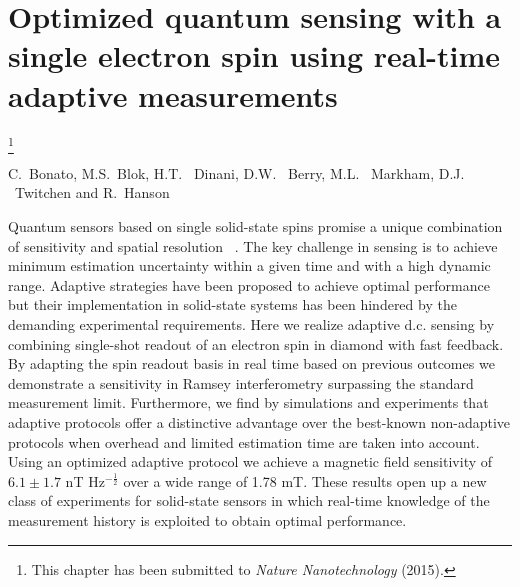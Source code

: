 

\graphicspath{{./ch_adptv_msmnt_magnetometry/figures/}}


\chapter{ Optimized quantum sensing with a single electron spin
using real-time adaptive measurements}
\label{ch:AMM}


{\renewcommand{\thefootnote}{}\footnote{This chapter has been submitted to
    {\em Nature Nanotechnology} (2015).}}

\begin{center} 
    \vspace{-1cm} {C.~Bonato, M.S.~Blok, H.T. ~Dinani, D.W. ~Berry, M.L. ~Markham, D.J. ~Twitchen  and R.~Hanson} 
\end{center}


\vspace{-0.5cm} 
Quantum sensors based on single solid-state spins promise a unique combination of sensitivity and spatial resolution ~\cite{Giovannetti_NatPhoton_2011,Higgins_Nature_2007,Degen_APL_2008,Taylor_NatPhys_2008,Maze_Nature_2008,Balasubramanian_Nature_2008,Balasubramanian_NatMater_2009,Dolde_NatPhys_2011,Acosta_Phys.Rev.Lett._2010,Toyli_PNAS_2013,Ovartchaiyapong_NatCommun_2014,LeSage_Nature_2013,Kaufmann_PNAS_2013,Kucsko_Nature_2013,Shi_Science_2015,Maletinsky_NatNano_2012,Staudacher_Science_2013,Mamin_Science_2013,Tetienne_Science_2014,Kolkowitz_Science_2015}. The key challenge in sensing is to achieve minimum estimation uncertainty within a given time and with a high dynamic range. Adaptive strategies have been proposed to achieve optimal performance but their implementation in solid-state systems has been hindered by the demanding experimental requirements. Here we realize adaptive d.c. sensing by combining single-shot readout of an electron spin in diamond with fast feedback. By adapting the spin readout basis in real time based on previous outcomes we demonstrate a sensitivity in Ramsey interferometry surpassing the standard measurement limit. Furthermore, we find by simulations and experiments that adaptive protocols offer a distinctive advantage over the best-known non-adaptive protocols when overhead and limited estimation time are taken into account. Using an optimized adaptive protocol we achieve a magnetic field sensitivity of $6.1\pm 1.7$ nT Hz$^{-\frac{1}{2}}$ over a wide range of 1.78 mT. These results open up a new class of experiments for solid-state sensors in which real-time knowledge of the measurement history is exploited to obtain optimal performance.


